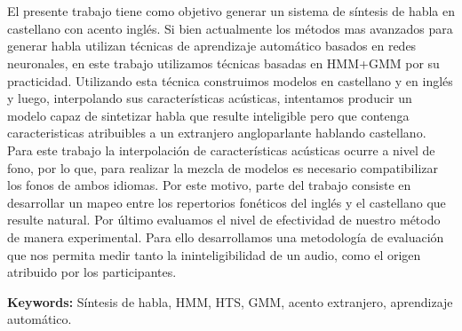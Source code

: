 \chapter*{\runtitle}

El presente trabajo tiene como objetivo generar un sistema de síntesis de habla en castellano con acento inglés. Si bien actualmente los métodos mas avanzados para generar habla utilizan técnicas de aprendizaje automático basados en redes neuronales, en este trabajo utilizamos técnicas basadas en HMM+GMM por su practicidad. Utilizando esta técnica construimos modelos en castellano y en inglés y luego, interpolando sus características acústicas, intentamos producir un modelo capaz de sintetizar habla que resulte inteligible pero que contenga caracteristicas atribuibles a un extranjero angloparlante hablando castellano. Para este trabajo la interpolación de características acústicas ocurre a nivel de fono, por lo que, para realizar la mezcla de modelos es necesario compatibilizar los fonos de ambos idiomas. Por este motivo, parte del trabajo consiste en desarrollar un mapeo entre los repertorios fonéticos del inglés y el castellano que resulte natural. Por último evaluamos el nivel de efectividad de nuestro método de manera experimental. Para ello desarrollamos una metodología de evaluación que nos permita medir tanto la ininteligibilidad de un audio, como el origen atribuido por los participantes.

\bigskip

\noindent\textbf{Keywords:} Síntesis de habla, HMM, HTS, GMM, acento extranjero, aprendizaje automático.